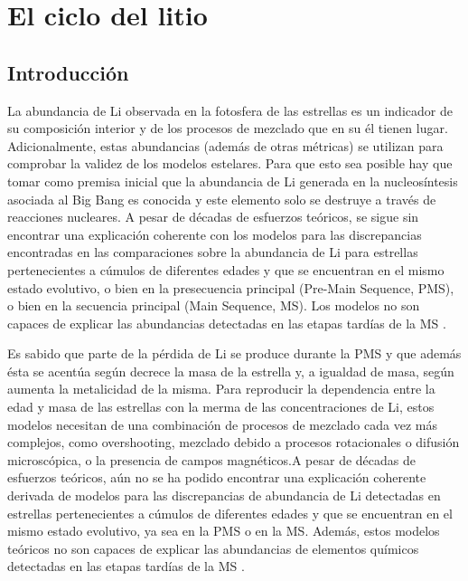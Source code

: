 
\chapter{El ciclo del litio}\label{ch:segundo-capitulo}

\section{Introducción}
La abundancia de Li observada en la fotosfera de las estrellas es un indicador de su composición interior y de los procesos de mezclado que en su él tienen lugar. Adicionalmente, estas abundancias (además de otras métricas) se utilizan para comprobar la validez de los modelos estelares. Para que esto sea posible hay que tomar como premisa inicial que la abundancia de Li generada en la nucleosíntesis asociada al Big Bang es conocida y este elemento solo se destruye a través de reacciones nucleares. A pesar de décadas de esfuerzos teóricos, se sigue sin encontrar una explicación coherente con los modelos para las discrepancias encontradas en las comparaciones sobre la abundancia de Li para estrellas pertenecientes a cúmulos de diferentes edades y que se encuentran en el mismo estado evolutivo, o bien en la presecuencia principal (Pre-Main Sequence, PMS), o bien en la secuencia principal (Main Sequence, MS). Los modelos no son capaces de explicar las abundancias detectadas en las etapas tardías de la MS \cite{Tschape2001}.\par

Es sabido que parte de la pérdida de Li se produce durante la PMS y que además ésta se acentúa según decrece la masa de la estrella y, a igualdad de masa, según aumenta la metalicidad de la misma. Para reproducir la dependencia entre la edad y masa de las estrellas con la merma de las concentraciones de Li, estos modelos necesitan de una combinación de procesos de mezclado cada vez más complejos, como overshooting, mezclado debido a procesos rotacionales o difusión microscópica, o la presencia de campos magnéticos.A pesar de décadas de esfuerzos teóricos, aún no se ha podido encontrar una explicación coherente derivada de modelos para las discrepancias de abundancia de Li detectadas en estrellas pertenecientes a cúmulos de diferentes edades y que se encuentran en el mismo estado evolutivo, ya sea en la PMS o en la MS. Además, estos modelos teóricos no son capaces de explicar las abundancias de elementos químicos detectadas en las etapas tardías de la MS \cite{Tschape2001}.\par


